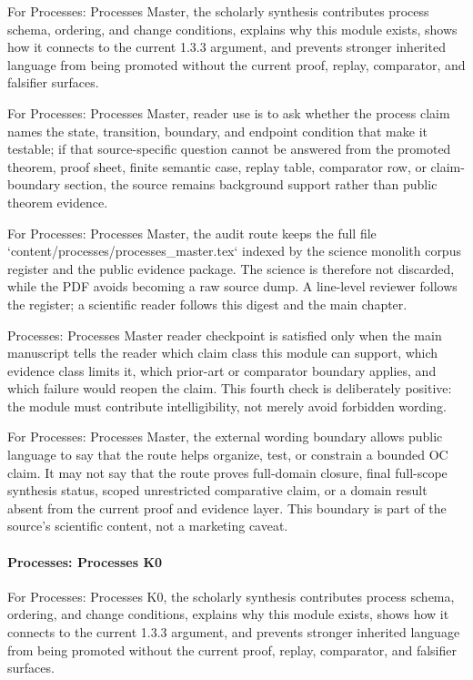 For Processes: Processes Master, the scholarly synthesis contributes process schema, ordering, and change conditions, explains why this module exists, shows how it connects to the current 1.3.3 argument, and prevents stronger inherited language from being promoted without the current proof, replay, comparator, and falsifier surfaces.


For Processes: Processes Master, reader use is to ask whether the process claim names the state, transition, boundary, and endpoint condition that make it testable; if that source-specific question cannot be answered from the promoted theorem, proof sheet, finite semantic case, replay table, comparator row, or claim-boundary section, the source remains background support rather than public theorem evidence.


For Processes: Processes Master, the audit route keeps the full file `content/processes/processes\_master.tex` indexed by the science monolith corpus register and the public evidence package. The science is therefore not discarded, while the PDF avoids becoming a raw source dump. A line-level reviewer follows the register; a scientific reader follows this digest and the main chapter.


Processes: Processes Master reader checkpoint is satisfied only when the main manuscript tells the reader which claim class this module can support, which evidence class limits it, which prior-art or comparator boundary applies, and which failure would reopen the claim. This fourth check is deliberately positive: the module must contribute intelligibility, not merely avoid forbidden wording.


For Processes: Processes Master, the external wording boundary allows public language to say that the route helps organize, test, or constrain a bounded OC claim. It may not say that the route proves full-domain closure, final full-scope synthesis status, scoped unrestricted comparative claim, or a domain result absent from the current proof and evidence layer. This boundary is part of the source's scientific content, not a marketing caveat.


\paragraph{Processes: Processes K0}

For Processes: Processes K0, the scholarly synthesis contributes process schema, ordering, and change conditions, explains why this module exists, shows how it connects to the current 1.3.3 argument, and prevents stronger inherited language from being promoted without the current proof, replay, comparator, and falsifier surfaces.


